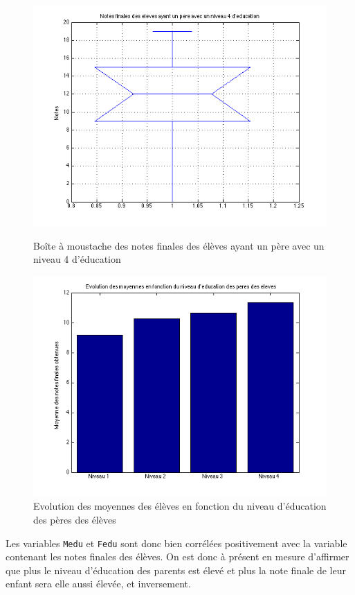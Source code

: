 \documentclass[11pt]{article}
\begin{document}
\begin{figure}[h]
\centering
\includegraphics[scale=0.6]{Images/fig38.png}
\caption{Boîte à moustache des notes finales des élèves ayant un père avec un niveau 4 d'éducation}
\includegraphics[scale=0.6]{Images/fig39.png}
\caption{Evolution des moyennes des élèves en fonction du niveau d'éducation des pères des élèves}
\end{figure}\FloatBarrier

Les variables \texttt{Medu} et \texttt{Fedu} sont donc bien corrélées positivement avec la variable contenant les notes finales des élèves. On est donc à présent en mesure d'affirmer que plus le niveau d'éducation des parents est élevé et plus la note finale de leur enfant sera elle aussi élevée, et inversement.
\end{document}
